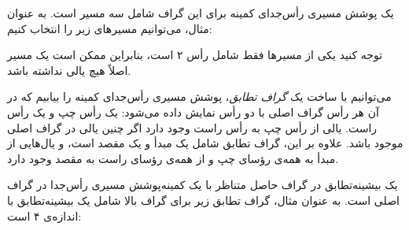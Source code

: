 یک پوشش مسیری رأس‌جدای کمینه
برای این گراف
شامل سه مسیر است.
به عنوان مثال، می‌توانیم مسیرهای زیر را انتخاب کنیم:

\begin{center}
\end{center}

توجه کنید یکی از مسیرها فقط شامل رأس ۲ است،
بنابراین ممکن است یک مسیر اصلاً هیچ یالی نداشته باشد.

می‌توانیم با ساخت یک \emph{گراف تطابق}، پوشش مسیری رأس‌جدای کمینه را
بیابیم که در آن هر رأس
گراف اصلی با
دو رأس نمایش داده می‌شود: یک رأس چپ و یک رأس راست.
یالی از رأس چپ به رأس راست وجود دارد
اگر چنین یالی در گراف اصلی موجود باشد.
علاوه بر این، گراف تطابق شامل یک مبدأ و یک مقصد است،
و یال‌هایی از مبدأ به همه‌ی
رؤسای چپ و از همه‌ی رؤسای راست به مقصد وجود دارد.

یک بیشینه‌تطابق در گراف حاصل متناظر
با یک کمینه‌پوشش مسیری رأس‌جدا در
گراف اصلی است.
به عنوان مثال، گراف تطابق زیر
برای گراف بالا شامل
یک بیشینه‌تطابق با اندازه‌ی ۴ است:

